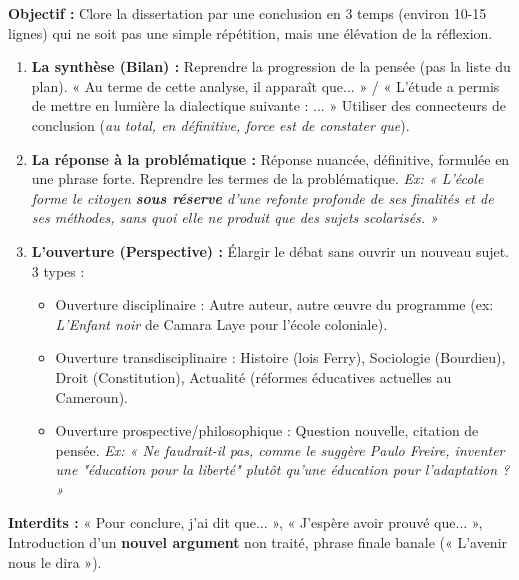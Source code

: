 \documentclass[11pt]{article}
\newcommand{\cle}[1]{{\popxbold\color{popdark}#1}}
\begin{document}
\begin{methode}
    \textbf{Objectif :} Clore la dissertation par une conclusion en 3 temps (environ 10-15 lignes) qui ne soit pas une simple répétition, mais une élévation de la réflexion.
    \begin{enumerate}
        \item \textbf{La synthèse (Bilan) :} Reprendre la \cle{progression de la pensée} (pas la liste du plan). « Au terme de cette analyse, il apparaît que... » / « L'étude a permis de mettre en lumière la dialectique suivante : ... » Utiliser des connecteurs de conclusion (\emph{au total, en définitive, force est de constater que}).
        \item \textbf{La réponse à la problématique :} Réponse \cle{nuancée, définitive, formulée en une phrase forte}. Reprendre les termes de la problématique. \textit{Ex: « L'école forme le citoyen \textbf{sous réserve} d'une refonte profonde de ses finalités et de ses méthodes, sans quoi elle ne produit que des sujets scolarisés. »}
        \item \textbf{L'ouverture (Perspective) :} Élargir le débat sans ouvrir un nouveau sujet. 3 types :
            \begin{itemize}
                \item \cle{Ouverture disciplinaire} : Autre auteur, autre œuvre du programme (ex: \emph{L'Enfant noir} de Camara Laye pour l'école coloniale).
                \item \cle{Ouverture transdisciplinaire} : Histoire (lois Ferry), Sociologie (Bourdieu), Droit (Constitution), Actualité (réformes éducatives actuelles au Cameroun).
                \item \cle{Ouverture prospective/philosophique} : Question nouvelle, citation de pensée. \textit{Ex: « Ne faudrait-il pas, comme le suggère Paulo Freire, inventer une "éducation pour la liberté" plutôt qu'une éducation pour l'adaptation ? »}
            \end{itemize}
    \end{enumerate}
    \textbf{Interdits :} « Pour conclure, j'ai dit que... », « J'espère avoir prouvé que... », Introduction d'un \textbf{nouvel argument} non traité, phrase finale banale (« L'avenir nous le dira »).
\end{methode}
\end{document}
